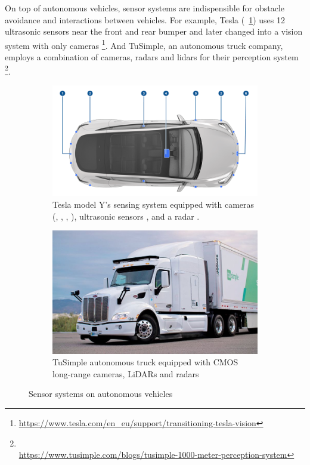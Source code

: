 On top of autonomous vehicles, sensor systems are indispensible for obstacle avoidance and interactions between vehicles.
For example, Tesla (~\ref{fig:intro-tesla}) uses 12 ultrasonic sensors 
near the front and rear bumper 
and later changed into a vision system with only cameras 
\footnote{\url{https://www.tesla.com/en_eu/support/transitioning-tesla-vision}}. 
And TuSimple, an autonomous truck company, employs a combination of cameras, radars and lidars 
for their perception system \footnote{\\\url{https://www.tusimple.com/blogs/tusimple-1000-meter-perception-system}}. 

\begin{figure}[ht] 
    \centering 

    \begin{subfigure}[b]{0.49\textwidth} 
        \includegraphics[width=\textwidth]{figures/tesla.png} 
        \caption{
        Tesla model Y's sensing system
        equipped with cameras (, 
        , 
        , ),
        ultrasonic sensors , and a radar .
        }
        \label{fig:intro-tesla} 
    \end{subfigure} \hfill
    \begin{subfigure}[b]{0.4\textwidth} 
        \includegraphics[width=\textwidth]{figures/tusimple.jpg} 
        \caption{TuSimple autonomous truck equipped with CMOS long-range cameras, 
        LiDARs and radars} 
        \label{fig:intro-truckcam} 
    \end{subfigure} 
    \caption{Sensor systems on autonomous vehicles}
    \label{fig:intro-autonomous-vehicles}
\end{figure} 

